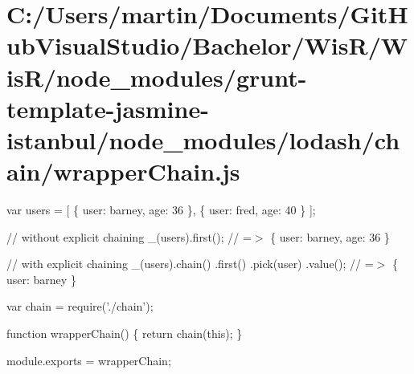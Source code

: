 \hypertarget{_c_1_2_users_2martin_2_documents_2_git_hub_visual_studio_2_bachelor_2_wis_r_2_wis_r_2node_modulefea2199cc00ae9a9d8cbf0f330e5554e}{}\section{C\+:/\+Users/martin/\+Documents/\+Git\+Hub\+Visual\+Studio/\+Bachelor/\+Wis\+R/\+Wis\+R/node\+\_\+modules/grunt-\/template-\/jasmine-\/istanbul/node\+\_\+modules/lodash/chain/wrapper\+Chain.\+js}
var users = \mbox{[} \{ \textquotesingle{}user\textquotesingle{}\+: \textquotesingle{}barney\textquotesingle{}, \textquotesingle{}age\textquotesingle{}\+: 36 \}, \{ \textquotesingle{}user\textquotesingle{}\+: \textquotesingle{}fred\textquotesingle{}, \textquotesingle{}age\textquotesingle{}\+: 40 \} \mbox{]};

// without explicit chaining \+\_\+(users).first(); // =$>$ \{ \textquotesingle{}user\textquotesingle{}\+: \textquotesingle{}barney\textquotesingle{}, \textquotesingle{}age\textquotesingle{}\+: 36 \}

// with explicit chaining \+\_\+(users).chain() .first() .pick(\textquotesingle{}user\textquotesingle{}) .value(); // =$>$ \{ \textquotesingle{}user\textquotesingle{}\+: \textquotesingle{}barney\textquotesingle{} \}


\begin{DoxyCodeInclude}
var chain = require(\textcolor{stringliteral}{'./chain'});

\textcolor{keyword}{function} wrapperChain() \{
  \textcolor{keywordflow}{return} chain(\textcolor{keyword}{this});
\}

module.exports = wrapperChain;
\end{DoxyCodeInclude}
 